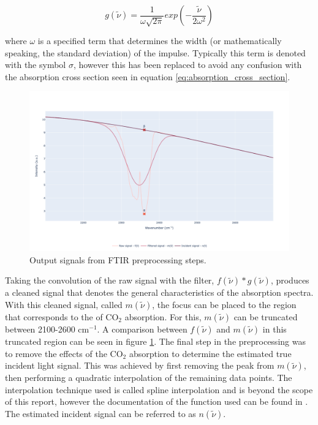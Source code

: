 \begin{equation}
    g(\tilde{\nu}) = \frac{1}{\omega \sqrt{2\pi}} exp \left ( -\frac{\tilde{\nu}}{2 \omega^2} \right )
\end{equation}

where $\omega$ is a specified term that determines the width (or mathematically speaking, the standard deviation) of the impulse. Typically this term is denoted with the symbol $\sigma$, however this has been replaced to avoid any confusion with the absorption cross section seen in equation \ref{eq:absorption_cross_section}. 

\begin{figure}[h!]
	\centering
	\includegraphics[width=1\linewidth]{chapter_4/figures/FTIR_preprocessing.png}
	\caption{Output signals from FTIR preprocessing steps.}
	\label{fig:FTIR_preprocessing}
\end{figure}

Taking the convolution of the raw signal with the filter, $f(\tilde{\nu}) * g(\tilde{\nu})$, produces a cleaned signal that denotes the general characteristics of the absorption spectra. With this cleaned signal, called $m(\tilde{\nu})$, the focus can be placed to the region that corresponds to the of CO$_2$ absorption. For this, $m(\tilde{\nu})$ can be truncated between 2100-2600 cm$^{-1}$. A comparison between $f(\tilde{\nu})$ and $m(\tilde{\nu})$ in this truncated region can be seen in figure \ref{fig:FTIR_preprocessing}. The final step in the preprocessing was to remove the effects of the CO$_2$ absorption to determine the estimated true incident light signal. This was achieved by first removing the peak from $m(\tilde{\nu})$, then performing a quadratic interpolation of the remaining data points. The interpolation technique used is called spline interpolation and is beyond the scope of this report, however the documentation of the function used can be found in \cite{PresTeukVettFlan92, BSpline_scipy}. The estimated incident signal can be referred to as $n(\tilde{\nu})$.

